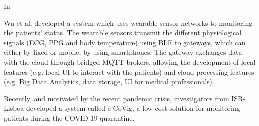 

%
%
%
%
%
%

In \cite{Wu2020} 

Wu et al. \cite{Wu2020} developed a system which uses wearable sensor networks to monitoring the patients' status. The wearable sensors transmit the different physiological signals (ECG, PPG and body temperature) using BLE to gateways, which can either by fixed or mobile, by using smartphones. The gateway exchanges data with the cloud through bridged MQTT brokers, allowing the development of local features (e.g. local UI to interact with the patients) and cloud processing features (e.g. Big Data Analytics, data storage, UI for medical professionals). 

%
%
%
%
%
Recently, and motivated by the recent pandemic crisis, investigators from ISR-Lisboa developed a system called e-CoVig, a low-cost solution for monitoring patients during the COVID-19 quarantine. 